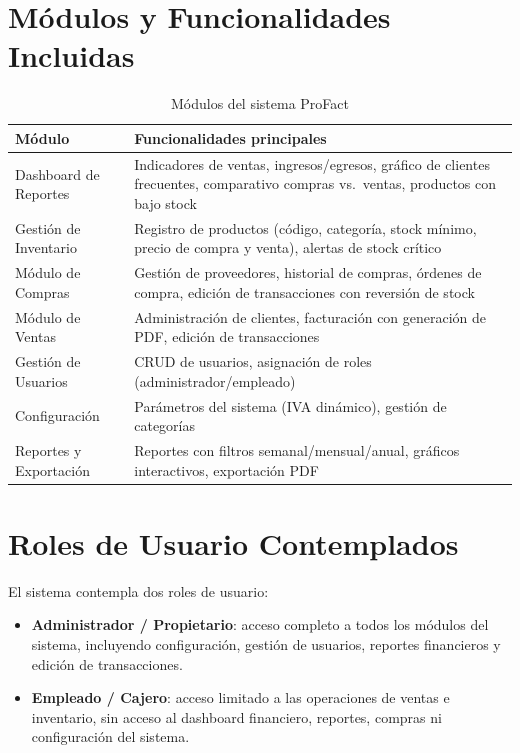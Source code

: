 \documentclass[12pt, letterpaper]{report}
\begin{document}
\section{Módulos y Funcionalidades Incluidas}

\begin{table}[H]
\centering
\caption{Módulos del sistema ProFact}
\renewcommand{\arraystretch}{1.3}
\begin{tabularx}{\textwidth}{|l|X|}
\hline
\textbf{Módulo} & \textbf{Funcionalidades principales} \\ \hline
Dashboard de Reportes & Indicadores de ventas, ingresos/egresos, gráfico de clientes frecuentes, comparativo compras vs.\ ventas, productos con bajo stock \\ \hline
Gestión de Inventario & Registro de productos (código, categoría, stock mínimo, precio de compra y venta), alertas de stock crítico \\ \hline
Módulo de Compras & Gestión de proveedores, historial de compras, órdenes de compra, edición de transacciones con reversión de stock \\ \hline
Módulo de Ventas & Administración de clientes, facturación con generación de PDF, edición de transacciones \\ \hline
Gestión de Usuarios & CRUD de usuarios, asignación de roles (administrador/empleado) \\ \hline
Configuración & Parámetros del sistema (IVA dinámico), gestión de categorías \\ \hline
Reportes y Exportación & Reportes con filtros semanal/mensual/anual, gráficos interactivos, exportación PDF \\ \hline
\end{tabularx}
\end{table}

\section{Roles de Usuario Contemplados}

El sistema contempla dos roles de usuario:
\begin{itemize}
    \item \textbf{Administrador / Propietario}: acceso completo a todos los módulos del sistema, incluyendo configuración, gestión de usuarios, reportes financieros y edición de transacciones.
    \item \textbf{Empleado / Cajero}: acceso limitado a las operaciones de ventas e inventario, sin acceso al dashboard financiero, reportes, compras ni configuración del sistema.
\end{itemize}
\end{document}
